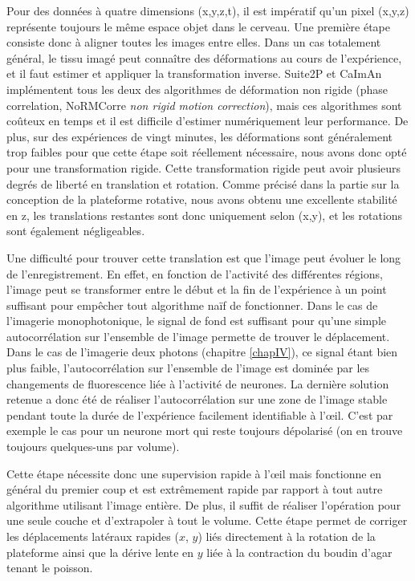 Pour des données à quatre dimensions (x,y,z,t), il est impératif qu'un pixel (x,y,z) représente toujours le même espace objet dans le cerveau. Une première étape consiste donc à aligner toutes les images entre elles. Dans un cas totalement général, le tissu imagé peut connaître des déformations au cours de l'expérience, et il faut estimer et appliquer la transformation inverse. Suite2P et CaImAn implémentent tous les deux des algorithmes de déformation non rigide (phase correlation, NoRMCorre \emph{non rigid motion correction}), mais ces algorithmes sont coûteux en temps et il est difficile d'estimer numériquement leur performance. De plus, sur des expériences de vingt minutes, les déformations sont généralement trop faibles pour que cette étape soit réellement nécessaire, nous avons donc opté pour une transformation rigide. Cette transformation rigide peut avoir plusieurs degrés de liberté en translation et rotation. Comme précisé dans la partie sur la conception de la plateforme rotative, nous avons obtenu une excellente stabilité en z, les translations restantes sont donc uniquement selon (x,y), et les rotations sont également négligeables. 

Une difficulté pour trouver cette translation est que l'image peut évoluer le long de l'enregistrement. En effet, en fonction de l'activité des différentes régions, l'image peut se transformer entre le début et la fin de l'expérience à un point suffisant pour empêcher tout algorithme naïf de fonctionner. Dans le cas de l'imagerie monophotonique, le signal de fond est suffisant pour qu'une simple autocorrélation sur l'ensemble de l'image permette de trouver le déplacement. Dans le cas de l'imagerie deux photons (chapitre \ref{chapIV}), ce signal étant bien plus faible, l'autocorrélation sur l'ensemble de l'image est dominée par les changements de fluorescence liée à l'activité de neurones. La dernière solution retenue a donc été de réaliser l'autocorrélation sur une zone de l'image stable pendant toute la durée de l'expérience facilement identifiable à l'œil. C'est par exemple le cas pour un neurone mort qui reste toujours dépolarisé (on en trouve toujours quelques-uns par volume).

Cette étape nécessite donc une supervision rapide à l'œil mais fonctionne en général du premier coup et est extrêmement rapide par rapport à tout autre algorithme utilisant l'image entière. De plus, il suffit de réaliser l'opération pour une seule couche et d'extrapoler à tout le volume. Cette étape permet de corriger les déplacements latéraux rapides ($x$, $y$) liés directement à la rotation de la plateforme ainsi que la dérive lente en $y$ liée à la contraction du boudin d'agar tenant le poisson.

